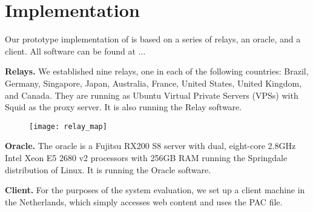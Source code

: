 \section{Implementation}
Our prototype implementation of \system{} is based on a series of relays, an oracle, and 
a client. All \system{} software can be found at ... 

{\bf Relays.}  We established nine relays, one in each of the following countries: Brazil, 
Germany, Singapore, Japan, Australia, France, United States, United Kingdom, and Canada.  
They are running as Ubuntu Virtual Private Servers (VPSs) with 
Squid as the proxy server.  It is also running the \system{} Relay software.

\begin{figure}[b!]
\centering
\texttt{[image: relay\_map]}
\caption{}
\label{fig:relay_locations}
\end{figure}

{\bf Oracle.}  The oracle is a Fujitsu RX200 S8 server with dual, 
eight-core 2.8GHz Intel Xeon E5 2680 v2 processors with 256GB RAM running the 
Springdale distribution of Linux. It is running the \system{} Oracle software.

{\bf Client.} For the purposes of the system evaluation, we set up a client 
machine in the Netherlands, which simply accesses web content and uses the PAC 
file.
